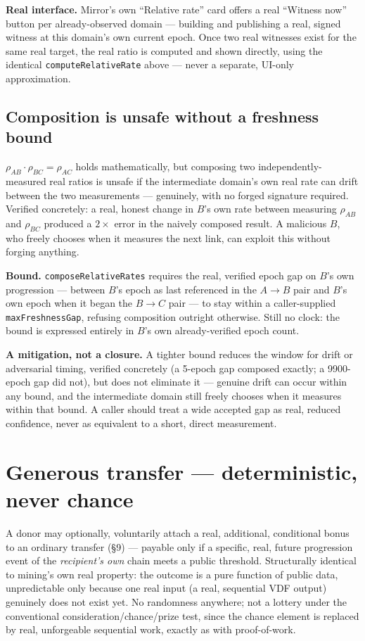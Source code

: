 \documentclass[10pt]{article}
\newcommand{\code}[1]{\texttt{\small #1}}
\begin{document}
\textbf{Real interface.} Mirror's own ``Relative rate'' card offers a real ``Witness now'' button per already-observed domain --- building and publishing a real, signed witness at this domain's own current epoch. Once two real witnesses exist for the same real target, the real ratio is computed and shown directly, using the identical \code{computeRelativeRate} above --- never a separate, UI-only approximation.

\subsection{Composition is unsafe without a freshness bound}

$\rho_{AB} \cdot \rho_{BC} = \rho_{AC}$ holds mathematically, but composing two independently-measured real ratios is unsafe if the intermediate domain's own real rate can drift between the two measurements --- genuinely, with no forged signature required. Verified concretely: a real, honest change in $B$'s own rate between measuring $\rho_{AB}$ and $\rho_{BC}$ produced a $2\times$ error in the naively composed result. A malicious $B$, who freely chooses when it measures the next link, can exploit this without forging anything.

\textbf{Bound.} \code{composeRelativeRates} requires the real, verified epoch gap on $B$'s own progression --- between $B$'s epoch as last referenced in the $A\to B$ pair and $B$'s own epoch when it began the $B\to C$ pair --- to stay within a caller-supplied \code{maxFreshnessGap}, refusing composition outright otherwise. Still no clock: the bound is expressed entirely in $B$'s own already-verified epoch count.

\textbf{A mitigation, not a closure.} A tighter bound reduces the window for drift or adversarial timing, verified concretely (a 5-epoch gap composed exactly; a 9900-epoch gap did not), but does not eliminate it --- genuine drift can occur within any bound, and the intermediate domain still freely chooses when it measures within that bound. A caller should treat a wide accepted gap as real, reduced confidence, never as equivalent to a short, direct measurement.

\section{Generous transfer --- deterministic, never chance}

A donor may optionally, voluntarily attach a real, additional, conditional bonus to an ordinary transfer (\S9) --- payable only if a specific, real, future progression event of the \emph{recipient's own} chain meets a public threshold. Structurally identical to mining's own real property: the outcome is a pure function of public data, unpredictable only because one real input (a real, sequential VDF output) genuinely does not exist yet. No randomness anywhere; not a lottery under the conventional consideration/chance/prize test, since the chance element is replaced by real, unforgeable sequential work, exactly as with proof-of-work.
\end{document}
